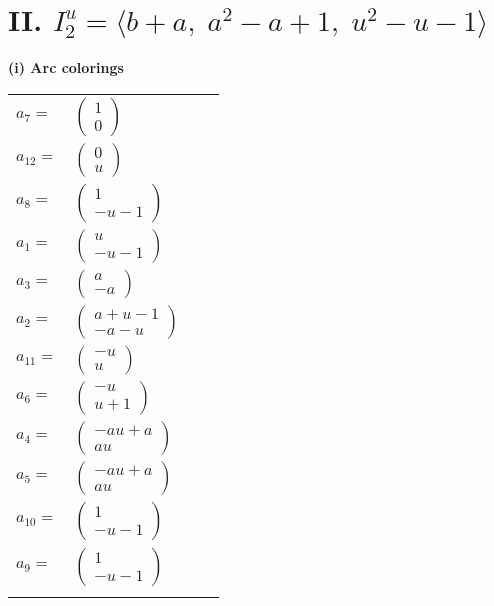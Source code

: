 \documentclass[1p]{elsarticle_modified}
\theoremstyle{definition}
\begin{document}
\centering \section*{II. $I^u_{2}= \langle b+a,\;a^2- a+1,\;u^2- u-1 \rangle$}
\flushleft \textbf{(i) Arc colorings}\\
\begin{tabular}{m{7pt} m{180pt} m{7pt} m{180pt} }
\flushright $a_{7}=$&$\begin{pmatrix}1\\0\end{pmatrix}$ \\
\flushright $a_{12}=$&$\begin{pmatrix}0\\u\end{pmatrix}$ \\
\flushright $a_{8}=$&$\begin{pmatrix}1\\- u-1\end{pmatrix}$ \\
\flushright $a_{1}=$&$\begin{pmatrix}u\\- u-1\end{pmatrix}$ \\
\flushright $a_{3}=$&$\begin{pmatrix}a\\- a\end{pmatrix}$ \\
\flushright $a_{2}=$&$\begin{pmatrix}a+u-1\\- a- u\end{pmatrix}$ \\
\flushright $a_{11}=$&$\begin{pmatrix}- u\\u\end{pmatrix}$ \\
\flushright $a_{6}=$&$\begin{pmatrix}- u\\u+1\end{pmatrix}$ \\
\flushright $a_{4}=$&$\begin{pmatrix}- a u+a\\a u\end{pmatrix}$ \\
\flushright $a_{5}=$&$\begin{pmatrix}- a u+a\\a u\end{pmatrix}$ \\
\flushright $a_{10}=$&$\begin{pmatrix}1\\- u-1\end{pmatrix}$ \\
\flushright $a_{9}=$&$\begin{pmatrix}1\\- u-1\end{pmatrix}$\\&\end{tabular}
\end{document}
